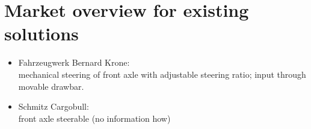 \documentclass[ExampleMasters.tex]{subfiles}
\begin{document}
\section{Market overview for existing solutions}
\label{sec:market_overview}
\begin{itemize}
	\item Fahrzeugwerk Bernard Krone: \\
	mechanical steering of front axle with adjustable steering ratio; input through movable drawbar.
	\item Schmitz Cargobull: \\
	front axle steerable (no information how)
	
\end{itemize}
\end{document}
